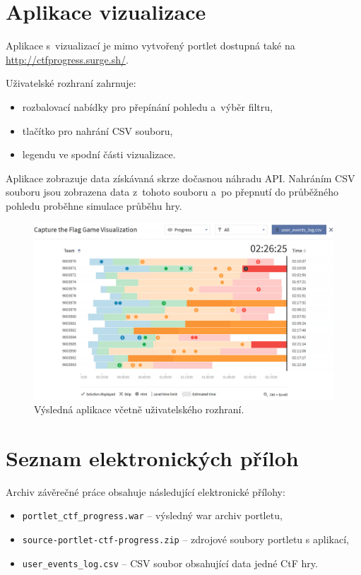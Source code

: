 \documentclass[
  digital, %
  oneside, %
  table,   %
  nolof,     %
  nolot,     %
  nocover
]{fithesis3}
\begin{document}
\chapter{Aplikace vizualizace}
Aplikace s~vizualizací je mimo vytvořený portlet dostupná také na \hyperref[http://ctfprogress.surge.sh/]{http://ctfprogress.surge.sh/}.\par
Uživatelské rozhraní zahrnuje:
\begin{itemize}
  \item rozbalovací nabídky pro přepínání pohledu a~výběr filtru,
  \item tlačítko pro nahrání CSV souboru,
  \item legendu ve spodní části vizualizace.
\end{itemize}
Aplikace zobrazuje data získávaná skrze dočasnou náhradu API. Nahráním CSV souboru jsou zobrazena data z~tohoto souboru a~po přepnutí do průběžného pohledu proběhne simulace průběhu hry.
\begin{figure}[H]
  \begin{center}
    \includegraphics[width=12.7cm]{images/aplikace.png}
  \end{center}
  \caption{Výsledná aplikace včetně uživatelského rozhraní.}
\end{figure}

\chapter{Seznam elektronických příloh}
Archiv závěrečné práce obsahuje následující elektronické přílohy:
\begin{itemize}
  \item \verb|portlet_ctf_progress.war| – výsledný war archiv portletu,
  \item \verb|source-portlet-ctf-progress.zip| – zdrojové soubory portletu s aplikací,
  \item \verb|user_events_log.csv| – CSV soubor obsahující data jedné CtF hry.
\end{itemize}
\end{document}
